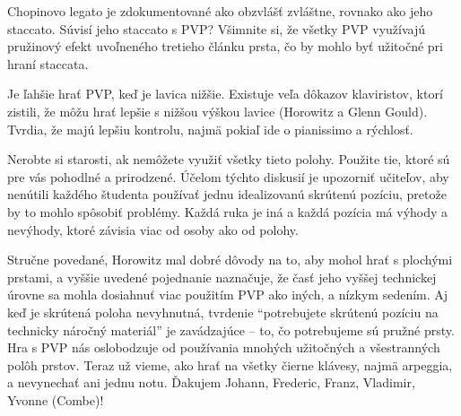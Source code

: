 \documentclass[11pt,a4paper]{book}
\begin{document}
%
%

Chopinovo legato je zdokumentované ako obzvlášť zvláštne, rovnako ako jeho staccato. Súvisí jeho staccato s PVP? Všimnite si, že všetky PVP využívajú pružinový efekt uvoľneného tretieho článku prsta, čo by mohlo byť užitočné pri hraní staccata.

Je ľahšie hrať PVP, keď je lavica nižšie. Existuje veľa dôkazov klaviristov, ktorí zistili, že môžu hrať lepšie s nižšou výškou lavice (Horowitz a Glenn Gould). Tvrdia, že majú lepšiu kontrolu, najmä pokiaľ ide o pianissimo a rýchlosť.

Nerobte si starosti, ak nemôžete využiť všetky tieto polohy. Použite tie, ktoré sú pre vás pohodlné a prirodzené. Účelom týchto diskusií je upozorniť učiteľov, aby nenútili každého študenta používať jednu idealizovanú skrútenú pozíciu, pretože by to mohlo spôsobiť problémy. Každá ruka je iná a každá pozícia má výhody a nevýhody, ktoré závisia viac od osoby ako od polohy.

Stručne povedané, Horowitz mal dobré dôvody na to, aby mohol hrať s plochými prstami, a vyššie uvedené pojednanie naznačuje, že časť jeho vyššej technickej úrovne sa mohla dosiahnuť viac použitím PVP ako iných, a nízkym sedením. Aj keď je skrútená poloha nevyhnutná, tvrdenie “potrebujete skrútenú pozíciu na technicky náročný materiál” je zavádzajúce – to, čo potrebujeme sú pružné prsty. Hra s PVP nás oslobodzuje od používania mnohých užitočných a všestranných polôh prstov. Teraz už vieme, ako hrať na všetky čierne klávesy, najmä arpeggia, a nevynechať ani jednu notu. Ďakujem Johann, Frederic, Franz, Vladimir, Yvonne (Combe)!
\end{document}

